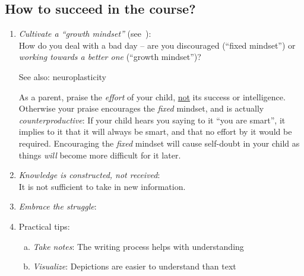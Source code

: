 \documentclass[pagesize,headsepline,10pt,parskip=half]{scrreprt}
\newenvironment{aside}
{\begin{mdframed}[style=0,%
  leftline=false,rightline=false,leftmargin=2em,rightmargin=2em,%
  innerleftmargin=0pt,innerrightmargin=0pt,linewidth=0.75pt,%
  skipabove=7pt,skipbelow=7pt]\small}
{\end{mdframed}}
\begin{document}
      \subsection{How to succeed in the course?}
        \begin{enumerate}
          \item
            \begin{samepage}
              \emph{Cultivate a “growth mindset”} (see~\cite{dweck2017mindset}):\\
              How do you deal with a bad day – are you discouraged (“fixed mindset”)
              or \emph{working towards a better one} (“growth mindset”)?

              See also: neuroplasticity\\
              \begin{aside}
                As a parent, praise the \emph{effort} of your child, \underline{not}
                its success or intelligence.  Otherwise your praise encourages
                the \emph{fixed} mindset, and is actually \emph{counterproductive}:
                If your child hears you saying to it “you are smart”, it implies
                to it that it will always be smart, and that no effort by it
                would be required.  Encouraging the \emph{fixed} mindset
                will cause self-doubt in your child as things \emph{will} become
                more difficult for it later.
              \end{aside}
            \end{samepage}
          \item \emph{Knowledge is constructed, not received}:\\
            It is not sufficient to take in new information.
          \item \emph{Embrace the struggle}:\\
          \item Practical tips:
            \begin{enumerate}[a)]
              \item \emph{Take notes}: The writing process helps with understanding
              \item \emph{Visualize}: Depictions are easier to understand than text

\end{enumerate}
\end{enumerate}
\end{document}
